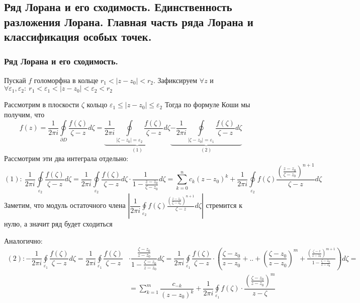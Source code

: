 \subsection{Ряд Лорана и его сходимость. Единственность разложения Лорана. Главная часть ряда Лорана и классификация особых точек.}


\subsubsection{Ряд Лорана и его сходимость.}
Пускай $f$ голоморфна в кольце $r_1<|z-z_0|<r_2$. Зафиксируем $\forall z$ и $\forall \varepsilon_1,\varepsilon_2:\ r_1<\varepsilon_1<|z-z_0|<\varepsilon_2<r_2$

Рассмотрим в плоскости $\zeta$ кольцо $\varepsilon_1\leq|z-z_0|\leq\varepsilon_2$
Тогда по формуле Коши мы получим, что 
$$
f(z)=\dfrac{1}{2\pi i}\oint\limits_{\partial D}\dfrac{f(\zeta)}{\zeta-z}d\zeta= \underbrace{\dfrac{1}{2\pi i}\oint\limits_{|\zeta-z_0|=\varepsilon_2}\dfrac{f(\zeta)}{\zeta-z}d\zeta}_{(1)}\underbrace{-\dfrac{1}{2\pi i}\oint\limits_{|\zeta-z_0|=\varepsilon_1}\dfrac{f(\zeta)}{\zeta-z}d\zeta}_{(2)}
$$
Рассмотрим эти два интеграла отдельно:
$$
(1)\colon\  \dfrac{1}{2\pi i}\oint\limits_{\varepsilon_2}\dfrac{f(\zeta)}{\zeta-z}d\zeta=\dfrac{1}{2\pi i}\oint\limits_{\varepsilon_2}\dfrac{f(\zeta)}{\zeta-z}d\zeta\cdot\dfrac{1}{1-\frac{z-z_0}{\zeta-z_0}}d\zeta=\sum\limits_{k=0}^{n}c_k(z-z_0)^k+\dfrac{1}{2\pi i} \oint\limits_{\varepsilon_2}f(\zeta)\frac{\left(\frac{z-z_0}{\zeta-z_0}\right)^{n+1}}{\zeta-z}d\zeta
$$
Заметим, что модуль остаточного члена $\left|\dfrac{1}{2\pi i} \oint\limits_{\varepsilon_2}f(\zeta)\frac{\left(\frac{z-z_0}{\zeta-z_0}\right)^{n+1}}{\zeta-z}d\zeta\right|$ стремится к нулю, а значит ряд будет сходиться

Аналогично:
\begin{align}
            (2)\colon-\dfrac{1}{2\pi i}\oint\limits_{\varepsilon_1}\dfrac{f(\zeta)}{\zeta-z}d\zeta=\dfrac{1}{2\pi i}\oint\limits_{\varepsilon_1}\dfrac{f(\zeta)}{\zeta-z}&\cdot \dfrac{\frac{\zeta-z_0}{z-z_0}}{1-\frac{\zeta-z_0}{z-z_0}}d\zeta=\dfrac{1}{2\pi i}\oint\limits_{\varepsilon_1}\dfrac{f(\zeta)}{\zeta-z}\cdot\left(\dfrac{\zeta-z_0}{z-z_0}+..+\left(\dfrac{\zeta-z_0}{z-z_0}\right)^m+\frac{\left(\frac{\zeta-z}{z-z_0}\right)^{m+1}}{1-\frac{\zeta-z_0}{z-z_0}}\right)d\zeta=
            \\
            &=\sum\limits_{k=1}^m \dfrac{c_{-k}}{(z-z_0)^k}+\dfrac{1}{2\pi i}\oint\limits_{\varepsilon_1}f(\zeta)\cdot\dfrac{\left(\frac{\zeta-z_0}{z-z_0}\right)^m}{z-\zeta}
        \end{align}


